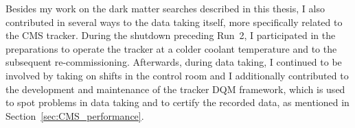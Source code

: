 Besides my work on the dark matter searches described in this thesis, I also contributed in several ways to the data taking itself, more specifically related to the \acs{CMS} tracker. During the shutdown preceding Run~2, I participated in the preparations to operate the tracker at a colder coolant temperature and to the subsequent re-commissioning. Afterwards, during data taking, I continued to be involved by taking on shifts in the control room and I additionally contributed to the development and maintenance of the tracker \acf{DQM} framework, which is used to spot problems in data taking and to certify the recorded data, as mentioned in Section~\ref{sec:CMS_performance}.


\clearpage{\pagestyle{empty}\cleardoublepage}
